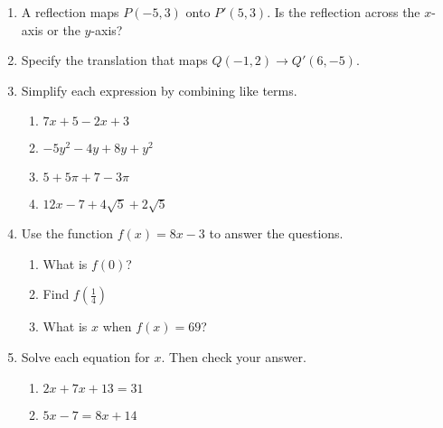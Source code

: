 \documentclass[12pt, twoside]{article}
\begin{document}
\begin{enumerate}[itemsep=0.5cm]
\item A reflection maps $P(-5,3)$ onto $P'(5,3)$. Is the reflection across the $x$-axis or the $y$-axis? \vspace{2cm}

\item Specify the translation that maps $Q(-1,2)\rightarrow Q'(6,-5)$.


\newpage
\item Simplify each expression by combining like terms.
  \begin{multicols}{2}
      \begin{enumerate}[itemsep=1.5cm]
        \item $7x+5-2x+3$
        \item $-5y^2-4y+8y+y^2$
        \item $5+5\pi+7-3\pi$
        \item $12x-7+4\sqrt{5}+2\sqrt{5}$
      \end{enumerate}
  \end{multicols} \vspace{1cm}

\item Use the function $f(x) = 8x-3$ to answer the questions.
  \begin{multicols}{2}
  \begin{enumerate}[itemsep=2cm]
      \item What is $f(0)$?
      \item Find $f(\frac{1}{4})$
      \item What is $x$ when $f(x) = 69$?
  \end{enumerate}
  \end{multicols} \vspace{2cm}

\item Solve each equation for $x$. Then check your answer.
  \begin{multicols}{2}
    \begin{enumerate}[itemsep=1cm]
  \item $2x+7x+13=31$
  \item $5x-7=8x+14$
  \end{enumerate}
  \end{multicols}


\end{enumerate}
\end{document}
